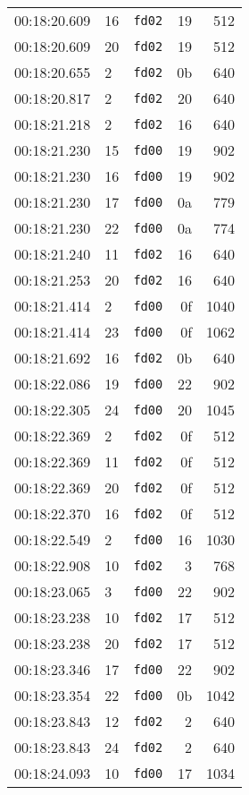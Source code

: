 \documentclass{article}
\begin{document}
\begin{longtable}{lllrr}
00:18:20.609 & 16 & \texttt{fd02} & 19 & 512 \\
00:18:20.609 & 20 & \texttt{fd02} & 19 & 512 \\
00:18:20.655 & 2 & \texttt{fd02} & 0b & 640 \\
00:18:20.817 & 2 & \texttt{fd02} & 20 & 640 \\
00:18:21.218 & 2 & \texttt{fd02} & 16 & 640 \\
00:18:21.230 & 15 & \texttt{fd00} & 19 & 902 \\
00:18:21.230 & 16 & \texttt{fd00} & 19 & 902 \\
00:18:21.230 & 17 & \texttt{fd00} & 0a & 779 \\
00:18:21.230 & 22 & \texttt{fd00} & 0a & 774 \\
00:18:21.240 & 11 & \texttt{fd02} & 16 & 640 \\
00:18:21.253 & 20 & \texttt{fd02} & 16 & 640 \\
00:18:21.414 & 2 & \texttt{fd00} & 0f & 1040 \\
00:18:21.414 & 23 & \texttt{fd00} & 0f & 1062 \\
00:18:21.692 & 16 & \texttt{fd02} & 0b & 640 \\
00:18:22.086 & 19 & \texttt{fd00} & 22 & 902 \\
00:18:22.305 & 24 & \texttt{fd00} & 20 & 1045 \\
00:18:22.369 & 2 & \texttt{fd02} & 0f & 512 \\
00:18:22.369 & 11 & \texttt{fd02} & 0f & 512 \\
00:18:22.369 & 20 & \texttt{fd02} & 0f & 512 \\
00:18:22.370 & 16 & \texttt{fd02} & 0f & 512 \\
00:18:22.549 & 2 & \texttt{fd00} & 16 & 1030 \\
00:18:22.908 & 10 & \texttt{fd02} & 3 & 768 \\
00:18:23.065 & 3 & \texttt{fd00} & 22 & 902 \\
00:18:23.238 & 10 & \texttt{fd02} & 17 & 512 \\
00:18:23.238 & 20 & \texttt{fd02} & 17 & 512 \\
00:18:23.346 & 17 & \texttt{fd00} & 22 & 902 \\
00:18:23.354 & 22 & \texttt{fd00} & 0b & 1042 \\
00:18:23.843 & 12 & \texttt{fd02} & 2 & 640 \\
00:18:23.843 & 24 & \texttt{fd02} & 2 & 640 \\
00:18:24.093 & 10 & \texttt{fd00} & 17 & 1034 \\

\end{longtable}
\end{document}
